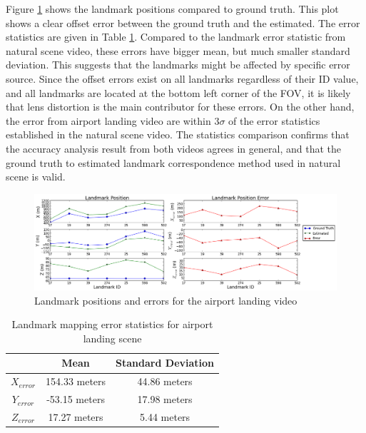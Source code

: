Figure \ref{fltfig:15} shows the landmark positions compared to ground
truth. This plot shows a clear offset error between the ground truth
and the estimated. The error statistics are given in Table
\ref{tab:lm_err_stats_airport}. Compared to the landmark error
statistic from natural scene video, these errors have bigger mean, but
much smaller standard deviation. This suggests that the landmarks
might be affected by specific error source. Since the offset errors
exist on all landmarks regardless of their ID value, and all landmarks
are located at the bottom left corner of the FOV, it is likely that
lens distortion is the main contributor for these errors. On the other
hand, the error from airport landing video are within $3\sigma$ of the
error statistics established in the natural scene video. The
statistics comparison confirms that the accuracy analysis result from
both videos agrees in general, and that the ground truth to estimated
landmark correspondence method used in natural scene is valid.


\begin{figure}[h]
\centering
\includegraphics[width=17cm, keepaspectratio=true]
{./Figures/fltfig/airport/Figure20.png}
\caption{Landmark positions and errors for the airport landing video}
\label{fltfig:15}
\end{figure}

\begin{table}[h]
\caption{Landmark mapping error statistics for airport landing scene}
\label{tab:lm_err_stats_airport}
\centering
\begin{tabular}{|c|c|c|}
\hline
          & Mean       & Standard Deviation \\ \hline
$X_{error}$ & 154.33 meters    & 44.86 meters            \\ \hline
$Y_{error}$ & -53.15 meters     & 17.98 meters             \\ \hline
$Z_{error}$ & 17.27 meters      & 5.44 meters              \\ \hline
\end{tabular}
\end{table} 



